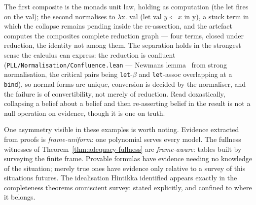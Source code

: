 The first composite is the monad\textquotesingle s unit law, holding as computation
(the let fires on the val); the second normalises to
\ensuremath{\lambda}x. val (let val \ensuremath{y \Leftarrow x} in y), a stuck term in which the collapse
remains pending inside the re-assertion, and the artefact computes the
composite\textquotesingle s complete reduction graph --- four terms, closed under
reduction, the identity not among them. The separation holds in the
strongest sense the calculus can express: the reduction is confluent
(\texttt{PLL/\allowbreak{}Normalisation/\allowbreak{}Confluence.lean} --- Newman\textquotesingle s lemma~\cite{Newman1942} from
strong normalisation, the critical pairs being \texttt{let}-\ensuremath{\beta} and
\texttt{let}-assoc overlapping at a \texttt{bind}), so normal forms are
unique, conversion is decided by the normaliser, and the failure is of
convertibility, not merely of reduction. Read doxastically, collapsing
a belief about a belief and then re-asserting belief in the result is
not a null operation on evidence, though it is one on truth.

One asymmetry visible in these examples is worth noting.
Evidence extracted from proofs is \emph{frame-uniform}: one polynomial
serves every model. The fullness witnesses of
Theorem~\ref{thm:adequacy-fullness} are
\emph{frame-aware}: tables built by surveying the finite frame. Provable
formulas have evidence needing no knowledge of the situation; merely
true ones have evidence only relative to a survey of this situation\textquotesingle s
futures. The idealisation Hintikka identified appears exactly in the
completeness theorem\textquotesingle s omniscient survey: stated explicitly, and confined to
where it belongs.


